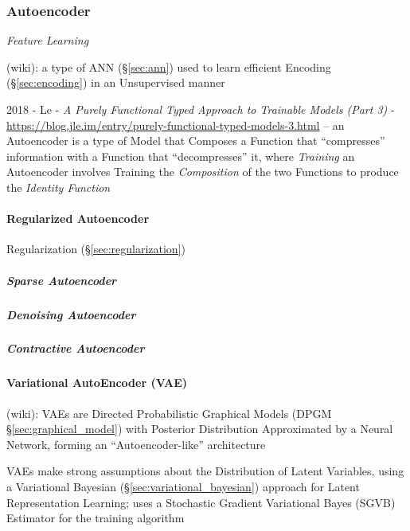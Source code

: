 \subsubsection{Autoencoder}\label{sec:autoencoder}

\emph{Feature Learning}

(wiki): a type of ANN (\S\ref{sec:ann}) used to learn efficient Encoding
(\S\ref{sec:encoding}) in an Unsupervised manner

2018 - Le -
\emph{A Purely Functional Typed Approach to Trainable Models (Part 3)} -
\url{https://blog.jle.im/entry/purely-functional-typed-models-3.html}
--
an Autoencoder is a type of Model that Composes a Function that ``compresses''
information with a Function that ``decompresses'' it, where \emph{Training} an
Autoencoder involves Training the \emph{Composition} of the two Functions to
produce the \emph{Identity Function}



\paragraph{Regularized Autoencoder}\label{sec:regularized_autoencoder}\hfill

\fist Regularization (\S\ref{sec:regularization})



\subparagraph{Sparse Autoencoder}\label{sec:sparse_autoencoder}\hfill

\subparagraph{Denoising Autoencoder}\label{sec:denoising_autoencoder}\hfill

\subparagraph{Contractive Autoencoder}\label{sec:contractive_autoencoder}\hfill



\paragraph{Variational AutoEncoder (VAE)}\label{sec:vae}\hfill

(wiki): VAEs are Directed Probabilistic Graphical Models (DPGM
\S\ref{sec:graphical_model}) with Posterior Distribution Approximated by a
Neural Network, forming an ``Autoencoder-like'' architecture

VAEs make strong assumptions about the Distribution of Latent Variables, using a
Variational Bayesian (\S\ref{sec:variational_bayesian}) approach for Latent
Representation Learning; uses a Stochastic Gradient Variational Bayes (SGVB)
Estimator for the training algorithm

